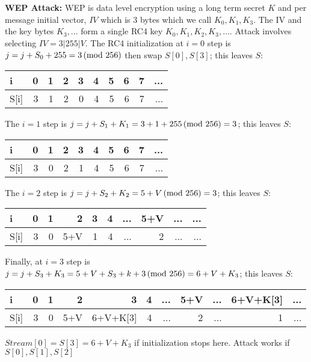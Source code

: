 \\
\\
{\bf WEP Attack:}
WEP is data level encryption using a long term secret $K$ and per message initial vector,
$IV$ which is $3$ bytes which we call $K_0, K_1, K_3$.  The IV and the key bytes $K_3, ...$
form a single RC4 key $K_0, K_1, K_2, K_3, \ldots$.  Attack involves selecting $IV= 3|255|V$.
The RC4 initialization at $i=0$ step is
$j= j+S_0+255 = 3 \thinspace \textnormal{(mod } 256 \textnormal{)}$ then swap $S[0], S[3]$; this leaves $S$:
\begin{center}
\begin{tabular} {|l|r|r|r|r|r|r|r|r|r|}
\hline
i & 0 & 1 & 2 & 3 & 4 & 5 & 6 & 7 & ... \\
\hline
S[i] & 3 & 1 & 2 & 0 & 4 & 5 & 6 & 7 & ... \\
\hline
\end{tabular}
\end{center}
The $i=1$ step is
$j= j+S_1+K_1 = 3+1+255 \thinspace \textnormal{(mod } 256 \textnormal{)}= 3$; this leaves $S$:
\begin{center}
\begin{tabular} {|l|r|r|r|r|r|r|r|r|r|}
\hline
i & 0 & 1 & 2 & 3 & 4 & 5 & 6 & 7 & ... \\
\hline
S[i] & 3 & 0 & 2 & 1 & 4 & 5 & 6 & 7 & ... \\
\hline
\end{tabular}
\end{center}
The $i=2$ step is
$j= j+S_2+K_2 = 5+V \thinspace \textnormal{(mod } 256 \textnormal{)}= 3$; this leaves $S$:
\begin{center}
\begin{tabular} {|l|r|r|r|r|r|r|r|r|r|}
\hline
i & 0 & 1 & 2 & 3 & 4 & ... & 5+V & ... & ... \\
\hline
S[i] & 3 & 0 & 5+V & 1 & 4 & ... & 2 & ... & ... \\
\hline
\end{tabular}
\end{center}
Finally, at $i=3$ step is
$j= j+S_3+K_3 = 5+V+S_3+k+3 \thinspace \textnormal{(mod } 256 \textnormal{)}= 6+V+K_3$; this leaves $S$:
\begin{center}
\begin{tabular} {|l|r|r|r|r|r|r|r|r|r|r|}
\hline
i & 0 & 1 & 2 & 3 & 4 & ... & 5+V & ... & 6+V+K[3] & ... \\
\hline
S[i] & 3 & 0 & 5+V & 6+V+K[3] & 4 & ... & 2 & ... & 1 & ... \\
\hline
\end{tabular}
\end{center}
$Stream[0]= S[3]=6+V+K_3$ if initialization stops here.  Attack works if
$S[0], S[1], S[2]$
